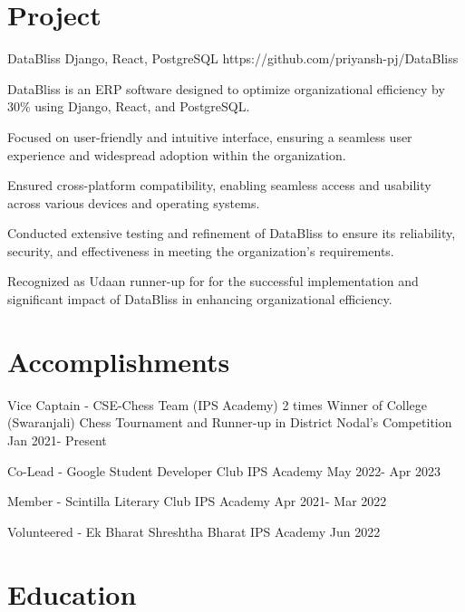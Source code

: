 \documentclass[letterpaper]{config}
\begin{document}
\section{Project}
\Project
    {DataBliss} %
    {Django, React, PostgreSQL} %
    {https://github.com/priyansh-pj/DataBliss}%
    {
        \item DataBliss is an ERP software designed to optimize organizational efficiency by 30\% using Django, React, and PostgreSQL.
        \item Focused on user-friendly and intuitive interface, ensuring a seamless user experience and widespread adoption within the organization.
        \item Ensured cross-platform compatibility, enabling seamless access and usability across various devices and operating systems.
        \item Conducted extensive testing and refinement of DataBliss to ensure its reliability, security, and effectiveness in meeting the organization's requirements.
        \item Recognized as Udaan runner-up for for the successful implementation and
significant impact of DataBliss in enhancing organizational eﬀiciency.
    }


\section{Accomplishments}


\Responsibility
    {Vice Captain - CSE-Chess Team (IPS Academy)} %
    {2 times Winner of College (Swaranjali) Chess Tournament and Runner-up in District Nodal’s Competition} %
    {Jan 2021- Present} %
    
\Responsibility
    {Co-Lead - Google Student Developer Club} %
    {IPS Academy} %
    {May 2022- Apr 2023} %

\Responsibility
    {Member - Scintilla Literary Club} %
    {IPS Academy} %
    {Apr 2021- Mar 2022} %
    

    
\Responsibility
    {Volunteered - Ek Bharat Shreshtha Bharat} %
    {IPS Academy} %
    {Jun 2022} %
    
    
\section{Education}
\end{document}
